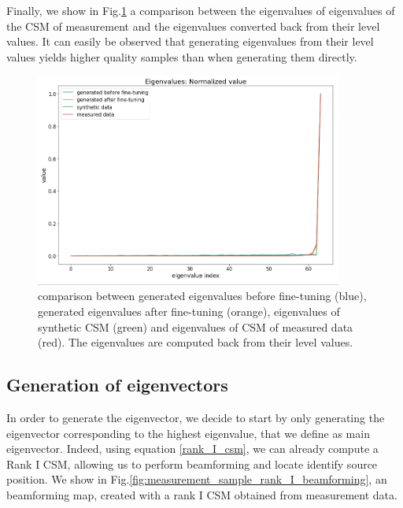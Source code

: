 \documentclass{article}
\begin{document}
Finally, we show in Fig.\ref{fig:evals_dB_not_level_sample_comparison} a comparison between the eigenvalues of eigenvalues of the CSM of measurement and the eigenvalues converted back from their level values. It can easily be observed that generating eigenvalues from their level values yields higher quality samples than when generating them directly.


\begin{figure}
    \centering
    \includegraphics[width=0.9\textwidth]{../figs/evals_dB_not_level_sample_comparison.png}    
    \caption{comparison between generated eigenvalues before fine-tuning (blue), generated eigenvalues after fine-tuning (orange), eigenvalues of synthetic CSM (green) and eigenvalues of CSM of measured data (red). The eigenvalues are computed back from their level values.}
    \label{fig:evals_dB_not_level_sample_comparison}
\end{figure} 


\subsection{Generation of eigenvectors}

In order to generate the eigenvector, we decide to start by only generating the eigenvector corresponding to the highest eigenvalue, that we define as main eigenvector. Indeed, using equation \ref{rank_I_csm}, we can already compute a Rank I CSM, allowing us to perform beamforming and locate identify source position. We show in Fig.\ref{fig:measurement_sample_rank_I_beamforming}, an beamforming map, created with a rank I CSM obtained from measurement data.
\end{document}
